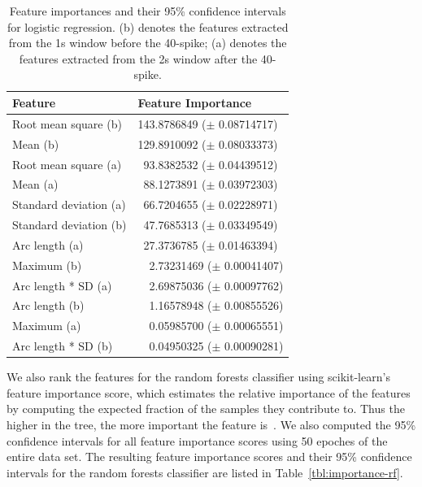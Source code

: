 \begin{table}[t]
\centering
\begin{tabular}{@{}ll@{}}
\toprule
Feature                & Feature Importance \\ \midrule
Root mean square (b)   &   143.8786849  ($\pm$ 0.08714717)       \\
Mean (b)               &   129.8910092 ($\pm$ 0.08033373)       \\ 
Root mean square (a)   &  \ 93.8382532  ($\pm$ 0.04439512)       \\
Mean (a)               &  \ 88.1273891  ($\pm$ 0.03972303)       \\
Standard deviation (a) &  \ 66.7204655  ($\pm$ 0.02228971)       \\
Standard deviation (b) &  \ 47.7685313  ($\pm$ 0.03349549)       \\
Arc length (a)         &  \ 27.3736785  ($\pm$ 0.01463394)       \\
Maximum (b)            & \ \ 2.73231469 ($\pm$ 0.00041407)       \\
Arc length * SD (a)    & \ \ 2.69875036 ($\pm$ 0.00097762)       \\
Arc length (b)         & \ \ 1.16578948 ($\pm$ 0.00855526)       \\
Maximum (a)            & \ \ 0.05985700 ($\pm$ 0.00065551)       \\
Arc length * SD (b)    & \ \ 0.04950325 ($\pm$ 0.00090281)       \\ \bottomrule

\end{tabular}
\caption{Feature importances and their 95\% confidence intervals for logistic regression. (b) denotes the features extracted from the 1s window before the 40-spike; (a) denotes the features extracted from the 2s window after the 40-spike.}
\label{tbl:importance-lr}
\end{table}

We also rank the features for the random forests classifier using scikit-learn's feature importance score, which estimates the relative importance of the features by computing the expected fraction of the samples they contribute to. 
Thus the higher in the tree, the more important the feature is~\cite{sklearn:rfdoc}. 
We also computed the 95\% confidence intervals for all feature importance scores using 50 epoches of the entire data set.
The resulting feature importance scores and their 95\% confidence intervals for the random forests classifier are listed in Table~\ref{tbl:importance-rf}.

